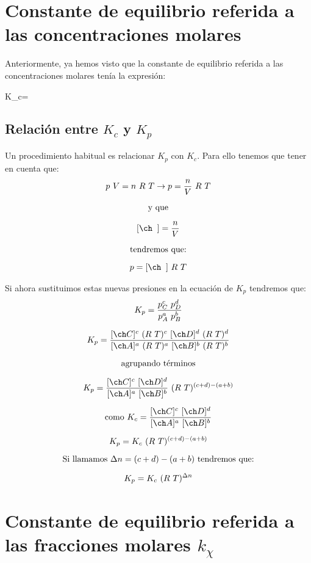 \section{Constante de equilibrio referida a las concentraciones molares}\label{sec:constante-de-equilibrio-referida-a-las-concentraciones-molares}

Anteriormente, ya hemos visto que la constante de equilibrio referida a las concentraciones molares tenía la expresión:
\begin{centeredequation}
    K_c= 
\end{centeredequation}

\subsection{Relación entre \texorpdfstring{\(K_c\)}{Kc} y \texorpdfstring{\(K_p\)}{Kp}}\label{subsec:relacion-entre-y-kp}

Un procedimiento habitual es relacionar \(K_p\) con \(K_c\).
Para ello tenemos que tener en cuenta que:
\begin{gather*}
    p\ V = n\ R\ T \rightarrow p = \dfrac{n}{V}\ R\ T  \separ
    \text{y que} \separ
    \conc{\; \;} = \dfrac{n}{V}\separ
    \text{tendremos que:}\separ
    p = \conc{\; \;}\ R\ T
\end{gather*}

Si ahora sustituimos estas nuevas presiones en la ecuación de \(K_p\) tendremos que:
\begin{gather}
    K_p = \dfrac{p_C^c\ p_D^d}{p_A^a\ p_B^b} \notag \separ
    K_p = \dfrac{\conc{C}^c\ (R\ T)^c\ \conc{D}^d\ (R\ T)^d}{\conc{A}^a\ (R\ T)^a\ \conc{B}^b\ (R\ T)^b} \notag\separ
    \text{agrupando términos} \notag \separ
    K_p= \dfrac{\conc{C}^c\ \conc{D}^d }{\conc{A}^a\ \conc{B}^b}\ (R\ T)^{(c+d)-(a+b)} \notag \separ
    \text{como } K_c = \dfrac{\conc{C}^c\ \conc{D}^d}{\conc{A}^a\ \conc{B}^b} \notag \separ
    K_p = K_c\ (R\ T)^{(c+d)-(a+b)} \notag \separ
    \text{Si llamamos } \Delta n = (c+d)-(a+b) \text{ tendremos que:} \notag \separ
    K_p = K_c\ (R\ T)^{\Delta n} \label{eq:relacion-kp-kc}
\end{gather}


\section{Constante de equilibrio referida a las fracciones molares \texorpdfstring{\(k_\chi\)}{kx}}\label{sec:constante-de-equilibrio-referida-a-las-fracciones-molares}

